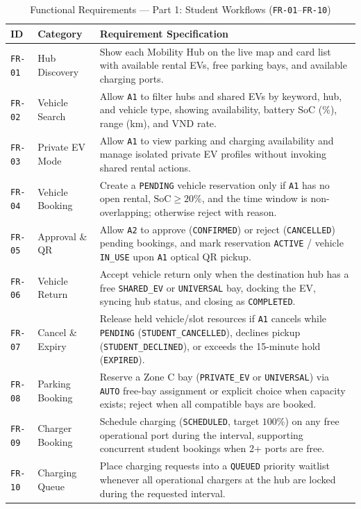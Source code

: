\begin{table}[H]
  \centering
  \singlespacing\footnotesize
  \caption{Functional Requirements --- Part 1: Student Workflows (\texttt{FR-01}--\texttt{FR-10})}
  \label{tab:fr-student}
  \renewcommand{\arraystretch}{1.22}
  \begin{tabularx}{\textwidth}{|C{1.4cm}|L{2.7cm}|Y|}
    \hline
    \textbf{ID} & \textbf{Category} & \textbf{Requirement Specification} \\
    \hline
    \texttt{FR-01} & Hub Discovery & Show each Mobility Hub on the live map and card list with available rental EVs, free parking bays, and available charging ports. \\
    \hline
    \texttt{FR-02} & Vehicle Search & Allow \texttt{A1} to filter hubs and shared EVs by keyword, hub, and vehicle type, showing availability, battery SoC (\%), range (km), and VND rate. \\
    \hline
    \texttt{FR-03} & Private EV Mode & Allow \texttt{A1} to view parking and charging availability and manage isolated private EV profiles without invoking shared rental actions. \\
    \hline
    \texttt{FR-04} & Vehicle Booking & Create a \texttt{PENDING} vehicle reservation only if \texttt{A1} has no open rental, $\text{SoC} \ge 20\%$, and the time window is non-overlapping; otherwise reject with reason. \\
    \hline
    \texttt{FR-05} & Approval \& QR & Allow \texttt{A2} to approve (\texttt{CONFIRMED}) or reject (\texttt{CANCELLED}) pending bookings, and mark reservation \texttt{ACTIVE} / vehicle \texttt{IN\_\allowbreak USE} upon \texttt{A1} optical QR pickup. \\
    \hline
    \texttt{FR-06} & Vehicle Return & Accept vehicle return only when the destination hub has a free \texttt{SHARED\_\allowbreak EV} or \texttt{UNIVERSAL} bay, docking the EV, syncing hub status, and closing as \texttt{COMPLETED}. \\
    \hline
    \texttt{FR-07} & Cancel \& Expiry & Release held vehicle/slot resources if \texttt{A1} cancels while \texttt{PENDING} (\texttt{STUDENT\_\allowbreak CANCELLED}), declines pickup (\texttt{STUDENT\_\allowbreak DECLINED}), or exceeds the 15-minute hold (\texttt{EXPIRED}). \\
    \hline
    \texttt{FR-08} & Parking Booking & Reserve a Zone C bay (\texttt{PRIVATE\_\allowbreak EV} or \texttt{UNIVERSAL}) via \texttt{AUTO} free-bay assignment or explicit choice when capacity exists; reject when all compatible bays are booked. \\
    \hline
    \texttt{FR-09} & Charger Booking & Schedule charging (\texttt{SCHEDULED}, target $100\%$) on any free operational port during the interval, supporting concurrent student bookings when 2+ ports are free. \\
    \hline
    \texttt{FR-10} & Charging Queue & Place charging requests into a \texttt{QUEUED} priority waitlist whenever all operational chargers at the hub are locked during the requested interval. \\
    \hline
  \end{tabularx}
\end{table}

